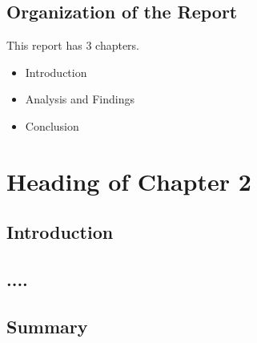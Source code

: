 \documentclass[12pt]{report}
\begin{document}
\section{Organization of the Report}

This report has 3 chapters. 

\begin{itemize}
	
	\item   Introduction
	\item   Analysis and Findings
	\item 	Conclusion
\end{itemize}
















\chapter{Heading of Chapter 2}

\section{Introduction}



\section{....}



\lipsum[2-4]






\section{Summary}
\end{document}
